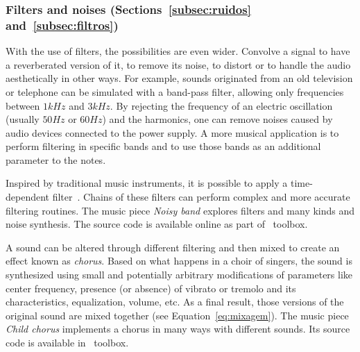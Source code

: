 \subsubsection{Filters and noises (Sections~\ref{subsec:ruidos} and~\ref{subsec:filtros})}
With the use of filters, the possibilities are even wider.
Convolve a signal to have a reverberated version of it, to remove its noise, to distort or to handle
the audio aesthetically in other ways. For example, sounds originated from an old television or telephone can be simulated with a band-pass filter, allowing only frequencies between $1kHz$ and $3kHz$. By rejecting the frequency of an electric oscillation (usually $50Hz$ or $60Hz$) and the harmonics, one can remove noises caused by audio devices connected to the power supply. A more musical application is to perform filtering in specific bands and to use those bands as an additional parameter to the notes.

Inspired by traditional music instruments, it is possible to apply a
time-dependent filter~\cite{Roederer}. Chains of these filters can perform complex and more accurate filtering routines. The music piece \emph{Noisy band} explores filters and many kinds and noise synthesis. The source code is available online as part of \massa\ toolbox.

A sound can be altered through different filtering and then mixed to create an effect known as \emph{chorus}. Based on what happens in a choir of singers, the sound is synthesized using small and potentially arbitrary modifications of parameters like center frequency, presence (or absence) of vibrato or tremolo and its characteristics, equalization, volume, etc. As a final result, those versions of the original sound are mixed together (see Equation~\ref{eq:mixagem}). The music piece \emph{Child chorus} implements a chorus in many ways with different sounds. Its source code is available in \massa\ toolbox.

